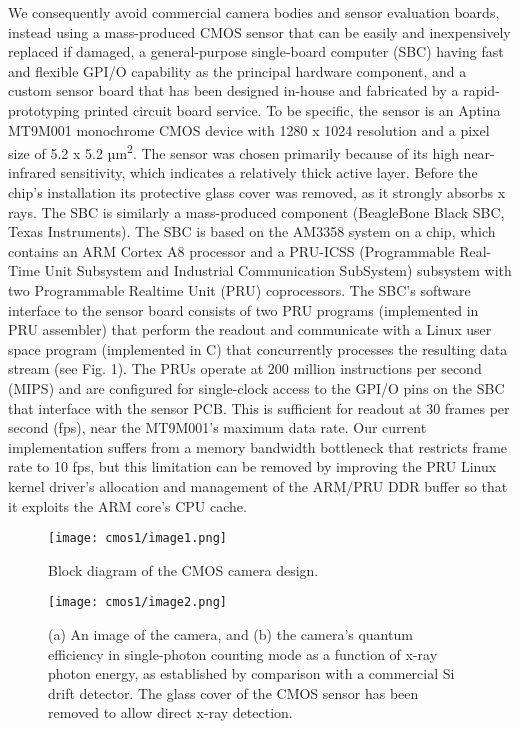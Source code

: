 We consequently avoid commercial camera bodies and sensor evaluation
boards, instead using a mass-produced CMOS sensor that can be easily and
inexpensively replaced if damaged, a general-purpose single-board
computer (SBC) having fast and flexible GPI/O capability as the
principal hardware component, and a custom sensor board that has been
designed in-house and fabricated by a rapid-prototyping printed circuit
board service. To be specific, the sensor is an Aptina MT9M001
monochrome CMOS device with 1280 x 1024 resolution and a pixel size of
5.2 x 5.2 µm\textsuperscript{2}. The sensor was chosen primarily because
of its high near-infrared sensitivity, which indicates a relatively
thick active layer. Before the chip's installation its protective glass
cover was removed, as it strongly absorbs x rays. The SBC is similarly a
mass-produced component (BeagleBone Black SBC, Texas Instruments). The
SBC is based on the AM3358 system on a chip, which contains an ARM
Cortex A8 processor and a PRU-ICSS (Programmable Real-Time Unit
Subsystem and Industrial Communication SubSystem) subsystem with two
Programmable Realtime Unit (PRU) coprocessors. The SBC's software
interface to the sensor board consists of two PRU programs (implemented
in PRU assembler) that perform the readout and communicate with a Linux
user space program (implemented in C) that concurrently processes the
resulting data stream (see Fig. 1). The PRUs operate at 200 million
instructions per second (MIPS) and are configured for single-clock
access to the GPI/O pins on the SBC that interface with the sensor PCB.
This is sufficient for readout at 30 frames per second (fps), near the
MT9M001's maximum data rate. Our current implementation suffers from a
memory bandwidth bottleneck that restricts frame rate to 10 fps, but
this limitation can be removed by improving the PRU Linux kernel
driver's allocation and management of the ARM/PRU DDR buffer so that it
exploits the ARM core's CPU cache.

\begin{figure}[h] \label{cm1image1}
\caption{ Block diagram of the CMOS camera design.}
\centering
{}\texttt{[image: cmos1/image1.png]}
\end{figure}

\begin{figure}[h] \label{cm1image2}
\caption{ (a) An image of the camera,
and (b) the camera's quantum efficiency in single-photon counting mode
as a function of x-ray photon energy, as established by comparison with
a commercial Si drift detector. The glass cover of the CMOS sensor has
been removed to allow direct x-ray detection.}
\centering
\texttt{[image: cmos1/image2.png]}
\end{figure}

